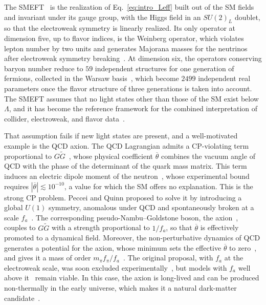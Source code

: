The
SMEFT~\cite{Buchmuller:1985jz,Grzadkowski:2010es,Brivio:2017vri,Isidori:2023pyp,Aebischer:2025qhh,Falkowski:2023hsg,Henning:2014wua}
is the realization of Eq.~\eqref{eq:intro_Leff} built out of the SM fields and invariant
under its gauge group, with the Higgs field in an $SU(2)_L$ doublet, so that the electroweak
symmetry is linearly realized. Its only operator at dimension five, up to flavor indices, is the
Weinberg operator, which violates lepton number by two units and generates Majorana masses for the
neutrinos after electroweak symmetry breaking~\cite{Weinberg:1979sa}. At dimension six, the
operators conserving baryon number reduce to $59$ independent structures for one generation of
fermions, collected in the Warsaw basis~\cite{Grzadkowski:2010es}, which become $2499$ independent
real parameters once the flavor structure of three generations is taken into
account. The SMEFT assumes that no light states other than those of the
SM exist below $\Lambda$, and it has become the reference framework for the combined
interpretation of collider, electroweak, and flavor
data~\cite{Brivio:2019ius,Ellis:2020unq,Ethier:2021bye,Celada:2024mcf}.

That assumption fails if new light states are present, and a well-motivated example is the QCD
axion. The QCD Lagrangian admits a CP-violating term proportional to $G\widetilde
G$~\cite{tHooft:1976rip,Callan:1976je,Jackiw:1976pf}, whose physical coefficient $\overline\theta$
combines the vacuum angle of QCD with the phase of the determinant of the quark mass matrix. This
term induces an electric dipole moment of the neutron~\cite{Baluni:1978rf,Crewther:1979pi}, whose
experimental bound~\cite{Abel:2020pzs} requires $|\overline\theta|\lesssim10^{-10}$, a value for
which the SM offers no explanation. This is the strong CP problem. Peccei and Quinn
proposed to solve it by introducing a global $U(1)$ symmetry, anomalous under QCD and spontaneously
broken at a scale $f_a$~\cite{Peccei:1977hh,Peccei:1977ur}. The corresponding
pseudo-Nambu--Goldstone boson, the axion~\cite{Weinberg:1977ma,Wilczek:1977pj}, couples to
$G\widetilde G$ with a strength proportional to $1/f_a$, so that $\overline\theta$ is effectively
promoted to a dynamical field. Moreover, the non-perturbative dynamics of QCD generates a potential
for the axion, whose minimum sets the effective $\overline\theta$ to zero~\cite{Vafa:1984xg}, and
gives it a mass of order $m_\pi
f_\pi/f_a$~\cite{Weinberg:1977ma,Wilczek:1977pj,GrillidiCortona:2015jxo}. The original proposal,
with $f_a$ at the electroweak scale, was soon excluded
experimentally~\cite{Donnelly:1978ty,DiLuzio:2020wdo}, but models with $f_a$ well above
it~\cite{Kim:1979if,Shifman:1979if,Dine:1981rt,Zhitnitsky:1980tq} remain viable. In this case, the
axion is long-lived and can be produced non-thermally in the early universe, which makes it a
natural dark-matter candidate~\cite{Abbott:1982af,Preskill:1982cy,Dine:1982ah,Davis:1986xc}.

